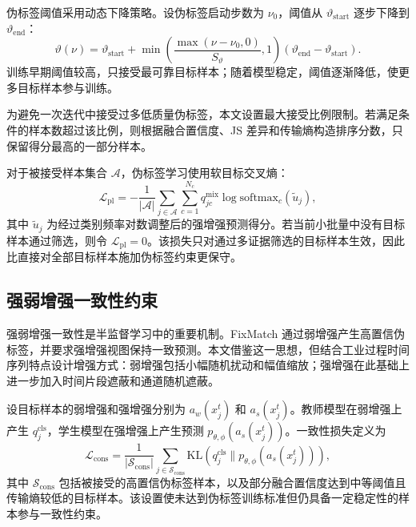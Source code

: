 \documentclass{seuthesis-2022}
\begin{document}
伪标签阈值采用动态下降策略。设伪标签启动步数为 $\nu_0$，阈值从 $\vartheta_{\mathrm{start}}$ 逐步下降到 $\vartheta_{\mathrm{end}}$：
\begin{equation}
    \vartheta(\nu)
    =
    \vartheta_{\mathrm{start}}
    +
    \min\left(
    \frac{\max(\nu-\nu_0,0)}{S_{\vartheta}},
    1
    \right)
    (\vartheta_{\mathrm{end}}-\vartheta_{\mathrm{start}}).
\end{equation}
训练早期阈值较高，只接受最可靠目标样本；随着模型稳定，阈值逐渐降低，使更多目标样本参与训练。

为避免一次迭代中接受过多低质量伪标签，本文设置最大接受比例限制。若满足条件的样本数超过该比例，则根据融合置信度、JS 差异和传输熵构造排序分数，只保留得分最高的一部分样本。

对于被接受样本集合 $\mathcal{A}$，伪标签学习使用软目标交叉熵：
\begin{equation}
    \mathcal{L}_{\mathrm{pl}}
    =
    -\frac{1}{|\mathcal{A}|}
    \sum_{j\in\mathcal{A}}
    \sum_{c=1}^{N_c}
    q_{jc}^{\mathrm{mix}}
    \log
    \mathrm{softmax}_c(\tilde{u}_j),
\end{equation}
其中 $\tilde{u}_j$ 为经过类别频率对数调整后的强增强预测得分。若当前小批量中没有目标样本通过筛选，则令 $\mathcal{L}_{\mathrm{pl}}=0$。该损失只对通过多证据筛选的目标样本生效，因此比直接对全部目标样本施加伪标签约束更保守。

\subsection{强弱增强一致性约束}

强弱增强一致性是半监督学习中的重要机制。FixMatch 通过弱增强产生高置信伪标签，并要求强增强视图保持一致预测\cite{sohn2020fixmatch}。本文借鉴这一思想，但结合工业过程时间序列特点设计增强方式：弱增强包括小幅随机扰动和幅值缩放；强增强在此基础上进一步加入时间片段遮蔽和通道随机遮蔽。

设目标样本的弱增强和强增强分别为 $a_w(x_j^t)$ 和 $a_s(x_j^t)$。教师模型在弱增强上产生 $q_j^{\mathrm{cls}}$，学生模型在强增强上产生预测 $p_{\theta,\phi}(a_s(x_j^t))$。一致性损失定义为
\begin{equation}
    \mathcal{L}_{\mathrm{cons}}
    =
    \frac{1}{|\mathcal{S}_{\mathrm{cons}}|}
    \sum_{j\in\mathcal{S}_{\mathrm{cons}}}
    \mathrm{KL}
    \left(
    q_j^{\mathrm{cls}}
    \|
    p_{\theta,\phi}(a_s(x_j^t))
    \right),
\end{equation}
其中 $\mathcal{S}_{\mathrm{cons}}$ 包括被接受的高置信伪标签样本，以及部分融合置信度达到中等阈值且传输熵较低的目标样本。该设置使未达到伪标签训练标准但仍具备一定稳定性的样本参与一致性约束。
\end{document}
